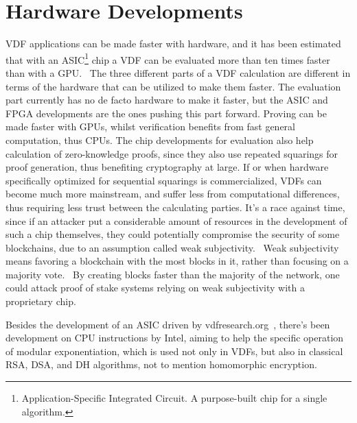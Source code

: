 \section{Hardware Developments}
VDF applications can be made faster with hardware, and it has been estimated that with an ASIC\footnote{Application-Specific Integrated Circuit. A purpose-built chip for a single algorithm.} chip a VDF can be evaluated more than ten times faster than with a GPU.~\cite{Stanford_Video2020-ap}
The three different parts of a VDF calculation are different in terms of the hardware that can be utilized to make them faster. The evaluation part currently has no de facto hardware to make it faster, but the ASIC and FPGA developments are the ones pushing this part forward. Proving can be made faster with GPUs, whilst verification benefits from fast general computation, thus CPUs.\cite{Protocol_Labs_Kelly_Olson2020-au} The chip developments for evaluation also help calculation of zero-knowledge proofs, since they also use repeated squarings for proof generation, thus benefiting cryptography at large.
If or when hardware specifically optimized for sequential squarings is commercialized, VDFs can become much more mainstream, and suffer less from computational differences, thus requiring less trust between the calculating parties. It's a race against time, since if an attacker put a considerable amount of resources in the development of such a chip themselves, they could potentially compromise the security of some blockchains, due to an assumption called weak subjectivity.~\cite{noauthor_2018-ro} Weak subjectivity means favoring a blockchain with the most blocks in it, rather than focusing on a majority vote.~\cite{Buterin2019-jz} By creating blocks faster than the majority of the network, one could attack proof of stake systems relying on weak subjectivity with a proprietary chip.

Besides the development of an ASIC driven by vdfresearch.org~\cite{noauthor_undated-hk}, there's been development on CPU instructions by Intel, aiming to help the specific operation of modular exponentiation, which is used not only in VDFs, but also in classical RSA, DSA, and DH algorithms, not to mention homomorphic encryption.~\cite{Drucker2019-cx} 
